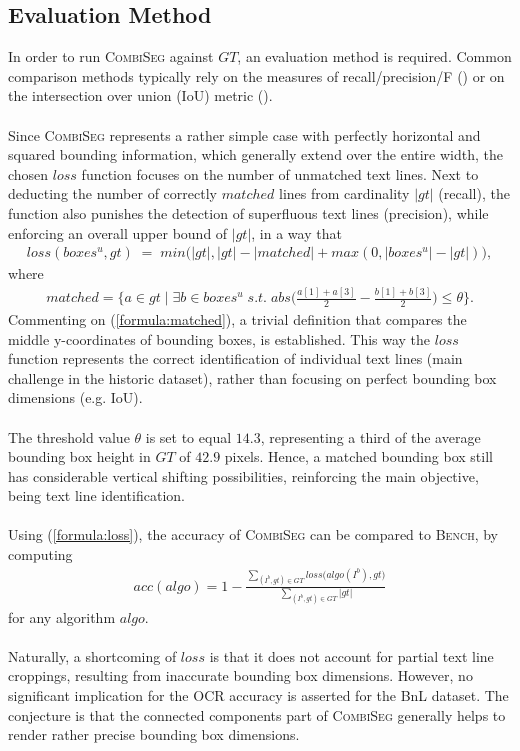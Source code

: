 \documentclass{jdmdh}
\begin{document}
\subsection{Evaluation Method} \label{section:evaluation}

In order to run \textsc{CombiSeg} against $GT$, an evaluation method is required.
Common comparison methods typically rely on the measures of recall/precision/F (\cite{measures}) or on the intersection over union (IoU) metric (\citet{iou}).
\\ \\
Since \textsc{CombiSeg} represents a rather simple case with perfectly horizontal and squared bounding information, which generally extend over the entire width, the chosen $loss$ function focuses on the number of unmatched text lines. Next to deducting the number of correctly $matched$ lines from cardinality $|gt|$ (recall), the function also punishes the detection of superfluous text lines (precision), while enforcing an overall upper bound of $|gt|$, in a way that
\begin{align}
loss(boxes^u, gt)\;=\;min\big(|gt|, |gt|\!-\!|matched|+max(0, |boxes^u|\!-\!|gt|)\big),\label{formula:loss}
\end{align}
where
\begin{align}
matched=\Big\{a\!\in\!gt\;\Big|\;\exists b\!\in\!boxes^u\;s.t.\; abs\Big(\frac{a[1]+a[3]}{2}\!-\!\frac{b[1]+b[3]}{2}\Big)\leq\theta\Big\}.\label{formula:matched}
\end{align}
Commenting on (\ref{formula:matched}), a trivial definition that compares the middle y-coordinates of bounding boxes, is established. This way the $loss$ function represents the correct identification of individual text lines (main challenge in the historic dataset), rather than focusing on perfect bounding box dimensions (e.g. IoU). \\ \\
The threshold value $\theta$ is set to equal $14.3$, representing a third of the average bounding box height in $GT$ of $42.9$ pixels. Hence, a matched bounding box still has considerable vertical shifting possibilities, reinforcing the main objective, being text line identification. \\ \\
Using (\ref{formula:loss}), the accuracy of \textsc{CombiSeg} can be compared to \textsc{Bench}, by computing
\begin{align}
    acc(algo)=1-\frac{\sum_{(I^b, gt)\in GT}loss\big(algo(I^b), gt\big)}{\sum_{(I^b, gt)\in GT}|gt|}
\end{align}
for any algorithm $algo$.
\\ \\
Naturally, a shortcoming of $loss$ is that it does not account for partial text line croppings, resulting from inaccurate bounding box dimensions. However, no significant implication for the OCR accuracy is asserted for the BnL dataset. The conjecture is that the connected components part of \textsc{CombiSeg} generally helps to render rather precise bounding box dimensions.
\end{document}
